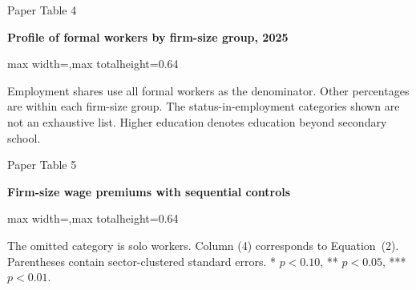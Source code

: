 \begin{frame}{Paper Table 4}
\begin{minipage}{\textwidth}\small\textbf{Profile of formal workers by firm-size group, 2025}\end{minipage}\par\vspace{0.15cm}
\centering\begingroup\fontsize{8.5}{10}\selectfont
\setlength{\tabcolsep}{4pt}\renewcommand{\arraystretch}{1.06}
\begin{adjustbox}{max width=\textwidth,max totalheight=0.64\textheight}

\end{adjustbox}\endgroup\par\vspace{0.10cm}
{\fontsize{6.5}{7.5}\selectfont\raggedright Employment shares use all formal workers as the denominator. Other percentages are within each firm-size group. The status-in-employment categories shown are not an exhaustive list. Higher education denotes education beyond secondary school.\par}
\end{frame}

\begin{frame}{Paper Table 5}
\begin{minipage}{\textwidth}\small\textbf{Firm-size wage premiums with sequential controls}\end{minipage}\par\vspace{0.15cm}
\centering\begingroup\fontsize{8.5}{10}\selectfont
\setlength{\tabcolsep}{4pt}\renewcommand{\arraystretch}{1.06}
\begin{adjustbox}{max width=\textwidth,max totalheight=0.64\textheight}

\end{adjustbox}\endgroup\par\vspace{0.10cm}
{\fontsize{6.5}{7.5}\selectfont\raggedright The omitted category is solo workers. Column (4) corresponds to Equation~(2). Parentheses contain sector-clustered standard errors. * $p<0.10$, ** $p<0.05$, *** $p<0.01$.\par}
\end{frame}

